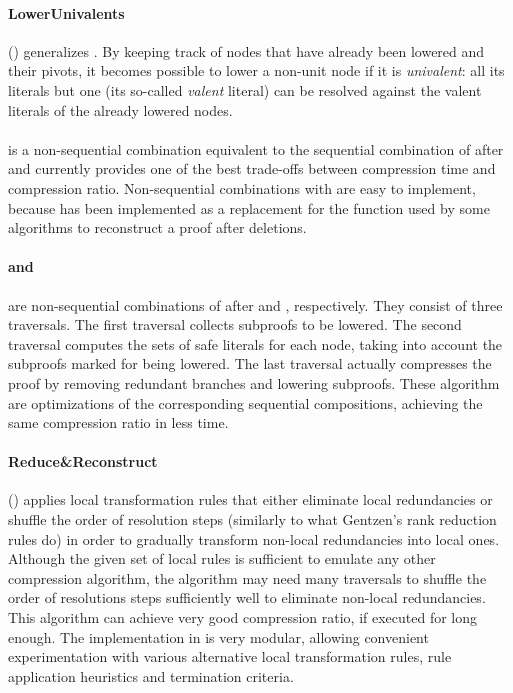\documentclass{llncs}
\begin{document}
\pskip

\paragraph{LowerUnivalents} () \cite{LUniv} generalizes . By
keeping track of nodes that have already been lowered and their pivots, it becomes
possible to lower a non-unit node if it is \emph{univalent}: all its literals but one (its so-called \emph{valent} literal) can be resolved against the valent literals of the already lowered nodes. 

\pskip

\paragraph{} \cite{LUniv} is a non-sequential combination equivalent to the sequential combination of  after  and currently provides one of the best trade-offs between compression time and compression ratio. Non-sequential combinations with  are easy to implement, because  has been implemented as a replacement for the  function used by some algorithms to reconstruct a proof after deletions. 
%

\pskip

\paragraph{ and } are non-sequential combinations of  after 
and , respectively. They consist of three traversals. The first traversal collects subproofs to be
lowered. The second traversal computes the sets of safe literals for each node,
taking into account the subproofs marked for being lowered. The last traversal actually compresses the proof by removing redundant branches and lowering subproofs. These algorithm are optimizations of the corresponding sequential compositions, achieving the
same compression ratio in less time. 

\pskip

\paragraph{Reduce\&Reconstruct} () \cite{RedRec} applies local transformation
rules that either eliminate local redundancies or shuffle the order of resolution steps (similarly to what Gentzen's rank reduction rules do) in order to gradually transform non-local redundancies into local ones. Although the given set of local rules is sufficient to emulate any
other compression algorithm, the algorithm may need many traversals to shuffle the order of resolutions steps sufficiently well to eliminate non-local redundancies. This algorithm can achieve very good
compression ratio, if executed for long enough.
%
The implementation in \skeptik is very modular, allowing convenient experimentation with various alternative local transformation rules, rule application heuristics and termination criteria.
\end{document}
